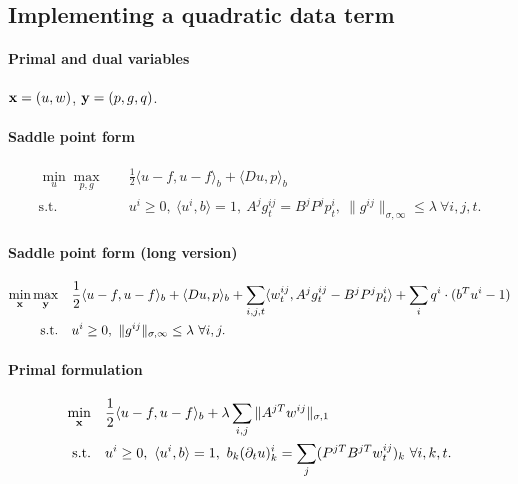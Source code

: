 
\subsection{Implementing a quadratic data term}

\paragraph{Primal and dual variables}
$\mathbf{x} = (u,w)$, $\mathbf{y} = (p,g,q)$.

\paragraph{Saddle point form}
\begin{align*}
    \min_{u} \max_{p,g} \quad
        & \frac{1}{2} \langle u-f, u-f \rangle_b + \langle Du, p \rangle_b \\
    \text{s.t.}\quad
        & u^i \geq 0, ~\langle u^i, b \rangle = 1,
          ~A^j g^{ij}_t = B^j P^j p^i_t,
          ~\|g^{ij}\|_{\sigma,\infty} \leq \lambda ~\forall i,j,t.
\end{align*}

\paragraph{Saddle point form (long version)}
\begin{align*}
    \min_{\mathbf{x}} \max_{\mathbf{y}} \quad
        & \frac{1}{2} \langle u-f, u-f \rangle_b
            + \langle Du, p \rangle_b
            + \sum_{i,j,t} \langle w^{ij}_t, A^j g^{ij}_t - B^j P^j p^i_t \rangle
            + \sum_{i} q^i \cdot (b^T u^i - 1) \\
    \text{s.t.}\quad
        & u^i \geq 0, ~\|g^{ij}\|_{\sigma,\infty} \leq \lambda ~\forall i,j.
\end{align*}

\paragraph{Primal formulation}
\begin{align*}
    \min_{\mathbf{x}} \quad
        & \frac{1}{2} \langle u-f, u-f \rangle_b
            + \lambda \sum_{i,j} \| A^{jT} w^{ij} \|_{\sigma,1} \\
    \text{s.t.}\quad
        & u^i \geq 0, ~\langle u^i, b \rangle = 1,
          ~b_k (\partial_t u)_k^i = \sum_j (P^{jT}B^{jT}w^{ij}_t)_{k} ~\forall i,k,t.
\end{align*}

